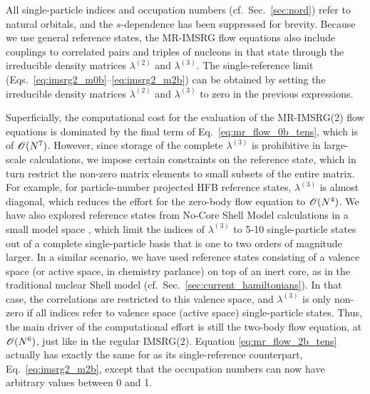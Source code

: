 All single-particle indices and occupation numbers (cf.~Sec.~\ref{sec:nord}) 
refer to natural orbitals, and the $s$-dependence has been suppressed for 
brevity. Because we use general reference states, the MR-IMSRG flow equations 
also include couplings to correlated pairs and triples of nucleons in that
state through the irreducible density matrices $\lambda^{(2)}$ and 
$\lambda^{(3)}$. The single-reference limit 
(Eqs.~\eqref{eq:imsrg2_m0b}--\eqref{eq:imsrg2_m2b}) 
can be obtained by setting the irreducible density matrices $\lambda^{(2)}$ 
and $\lambda^{(3)}$ to zero in the previous expressions.

Superficially, the computational cost for the evaluation of the MR-IMSRG(2) 
flow equations is dominated by the final term of Eq.~\eqref{eq:mr_flow_0b_tens},
which is of $\mathcal{O}(N^7)$. However, since storage of the complete $\lambda^{(3)}$ 
is prohibitive in large-scale calculations, we impose certain constraints on
the reference state, which in turn restrict the non-zero matrix elements to
small subsets of the entire matrix. For example, for particle-number projected
HFB reference states, $\lambda^{(3)}$ is almost diagonal, which reduces the
effort for the zero-body flow equation to $\mathcal{O}(N^4)$. We have also explored
reference states from No-Core Shell Model calculations in a small model space 
\cite{Gebrerufael:2016rp},
which limit the indices of $\lambda^{(3)}$ to 5-10 single-particle states
out of a complete single-particle basis that is one to two orders of magnitude
larger. In a similar scenario, we have used reference states consisting of 
a valence space (or active space, in chemistry parlance) on top of an inert
core, as in the traditional nuclear Shell model (cf.~Sec.~\ref{sec:current_hamiltonians}). 
In that case, the correlations are restricted to this valence space, and 
$\lambda^{(3)}$ is only non-zero if all indices refer to valence space
(active space) single-particle states. Thus, the main driver of the computational
effort is still the two-body flow equation, at $\mathcal{O}(N^6)$, just like in the
regular IMSRG(2). Equation \eqref{eq:mr_flow_2b_tens} actually has exactly
the same for as its single-reference counterpart, Eq.~\eqref{eq:imsrg2_m2b},
except that the occupation numbers can now have arbitrary values between 0 and 1.

%
%
